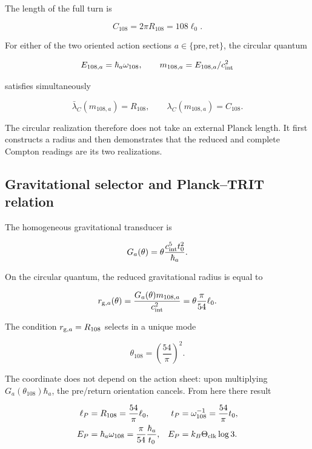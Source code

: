 The length of the full turn is

\begin{equation}
C_{108}=2\pi R_{108}=108\ell_0.
\label{rm:eq:cosmo-C108}
\end{equation}

For either of the two oriented action sections
\(a\in\{\mathrm{pre},\mathrm{ret}\}\), the circular quantum

\[
E_{108,a}=\hbar_a\omega_{108},
\qquad
m_{108,a}=E_{108,a}/c_{\rm int}^2
\]

satisfies simultaneously

\begin{equation}
\bar\lambda_C(m_{108,a})=R_{108},
\qquad
\lambda_C(m_{108,a})=C_{108}.
\label{rm:eq:cosmo-compton}
\end{equation}

The circular realization therefore does not take an external Planck length.
It first constructs a radius and then demonstrates that the reduced and
complete Compton readings are its two realizations.

\subsection{Gravitational selector and Planck--TRIT relation}

The homogeneous gravitational transducer is

\begin{equation}
G_a(\theta)=\theta\frac{c_{\rm int}^5t_0^2}{\hbar_a}.
\label{rm:eq:cosmo-Gtheta}
\end{equation}

On the circular quantum, the reduced gravitational radius is equal to

\[
r_{{\rm g},a}(\theta)
=\frac{G_a(\theta)m_{108,a}}{c_{\rm int}^2}
=\theta\frac{\pi}{54}\ell_0.
\]

The condition \(r_{{\rm g},a}=R_{108}\) selects in a unique mode

\begin{equation}
\theta_{108}=\left(\frac{54}{\pi}\right)^2.
\label{rm:eq:cosmo-theta108}
\end{equation}

The coordinate does not depend on the action sheet: upon multiplying
\(G_a(\theta_{108})\hbar_a\), the pre/return orientation cancels. From here
there result

\begin{align}
\ell_P&=R_{108}=\frac{54}{\pi}\ell_0,
&
t_P&=\omega_{108}^{-1}=\frac{54}{\pi}t_0,
\label{rm:eq:cosmo-planck-length-time}\\
E_P&=\hbar_a\omega_{108}
=\frac{\pi}{54}\frac{\hbar_a}{t_0},
&
E_P&=k_B\Theta_{\rm clk}\log3.
\label{rm:eq:cosmo-planck-trit}
\end{align}


